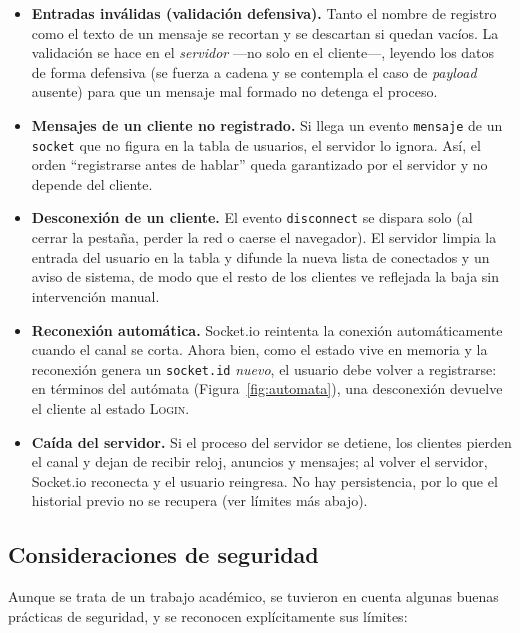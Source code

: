 \documentclass[12pt,a4paper]{article}
\begin{document}
\begin{itemize}[leftmargin=1.4em]
    \item \textbf{Entradas inválidas (validación defensiva).} Tanto el nombre de registro como el texto de un mensaje se recortan y se descartan si quedan vacíos. La validación se hace en el \emph{servidor} —no solo en el cliente—, leyendo los datos de forma defensiva (se fuerza a cadena y se contempla el caso de \textit{payload} ausente) para que un mensaje mal formado no detenga el proceso.
    \item \textbf{Mensajes de un cliente no registrado.} Si llega un evento \texttt{mensaje} de un \texttt{socket} que no figura en la tabla de usuarios, el servidor lo ignora. Así, el orden ``registrarse antes de hablar'' queda garantizado por el servidor y no depende del cliente.
    \item \textbf{Desconexión de un cliente.} El evento \texttt{disconnect} se dispara solo (al cerrar la pestaña, perder la red o caerse el navegador). El servidor limpia la entrada del usuario en la tabla y difunde la nueva lista de conectados y un aviso de sistema, de modo que el resto de los clientes ve reflejada la baja sin intervención manual.
    \item \textbf{Reconexión automática.} Socket.io reintenta la conexión automáticamente cuando el canal se corta. Ahora bien, como el estado vive en memoria y la reconexión genera un \texttt{socket.id} \emph{nuevo}, el usuario debe volver a registrarse: en términos del autómata (Figura~\ref{fig:automata}), una desconexión devuelve el cliente al estado \textsc{Login}.
    \item \textbf{Caída del servidor.} Si el proceso del servidor se detiene, los clientes pierden el canal y dejan de recibir reloj, anuncios y mensajes; al volver el servidor, Socket.io reconecta y el usuario reingresa. No hay persistencia, por lo que el historial previo no se recupera (ver límites más abajo).
\end{itemize}

\subsection{Consideraciones de seguridad}
\label{sec:seguridad}

Aunque se trata de un trabajo académico, se tuvieron en cuenta algunas buenas prácticas de seguridad, y se reconocen explícitamente sus límites:
\end{document}
